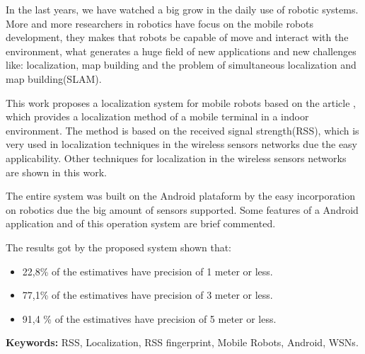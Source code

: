   In the last years, we have watched a big grow in the daily use of robotic systems. 
  More and more researchers in robotics have focus on the mobile robots development, they makes that 
  robots be capable of move and interact with the environment, what generates a huge field of new 
  applications and new challenges like: localization, map building and the problem of simultaneous
  localization and map building(SLAM).

  This work proposes a localization system for mobile robots based on the article \cite{wifiRadar}, 
  which provides a localization method of a mobile terminal in a indoor environment. The method is 
  based on the received signal strength(RSS), which is very used in localization techniques 
  in the wireless sensors networks due the easy applicability. Other techniques for localization 
  in the wireless sensors networks are shown in this work.
  
  The entire system was built on the Android plataform by the easy incorporation on robotics 
  due the big amount of sensors supported. 
  Some features of a Android application and of this operation system are brief commented. 
  
  The results got by the proposed system shown that:
      \begin{itemize}
      \item 22,8\% of the estimatives have precision of 1 meter or less.
      \item 77,1\% of the estimatives have precision of 3 meter or less.
      \item 91,4 \% of the estimatives have precision of 5 meter or less.
     \end{itemize}
  \textbf{Keywords:} RSS, Localization, RSS fingerprint, Mobile Robots, Android, WSNs.